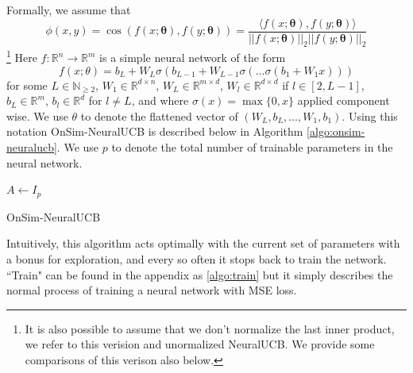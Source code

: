 \documentclass{article}
\begin{document}
Formally, we assume that
\[ \phi(x,y) = \cos\left(f(x;\mathbf{\theta}), f(y;\mathbf{\theta})\right) = \frac{\langle f(x;\mathbf{\theta}), f(y;\mathbf{\theta}) \rangle}{||f(x;\mathbf{\theta})||_2 ||f(y;\mathbf{\theta})||_2}\]
\footnote{It is also possible to assume that we don't normalize the last inner product, we refer to this verision and unormalized NeuralUCB. We provide some comparisons of this verison also below.}
Here $f: \mathbb{R}^n \to \mathbb{R}^m$ is a simple neural network of the form
\[ f(x; \theta) = b_L + W_{L} \sigma\left(b_{L-1} +  W_{L-1} \sigma\left( \dots \sigma\left(b_1 + W_1 x\right)\right) \right)\]
for some $L \in \mathbb{N}_{\geq 2}$, $W_1 \in \mathbb{R}^{d \times n}$, $W_{L} \in \mathbb{R}^{m \times d}$, $W_{l} \in \mathbb{R}^{d\times d}$ if $l \in [2, L-1]$, $b_L \in \mathbb{R}^m$, $b_l \in \mathbb{R}^d$ for $l \neq L$, and where $\sigma(x) = \max\{0, x\}$ applied component wise. We use $\theta$ to denote the flattened vector of $(W_L, b_L, \dots, W_1, b_1)$.
Using this notation OnSim-NeuralUCB is described below in Algorithm \ref{algo:onsim-neuralucb}. We use $p$ to denote the total number of trainable parameters in the neural network.

\begin{algorithm}
    $A \gets I_{p}$\;
    \caption{OnSim-NeuralUCB}\label{algo:onsim-neuralucb}
  \end{algorithm}
Intuitively, this algorithm acts optimally with the current set of parameters with a bonus for exploration, and every so often it stops back to train the network.
``Train" can be found in the appendix as \ref{algo:train} but it simply describes the normal process of training a neural network with MSE loss.
\end{document}
